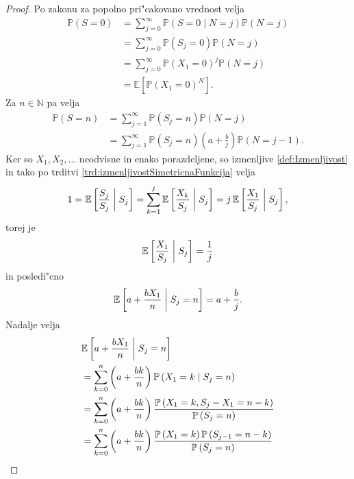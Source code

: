\documentclass[12pt, a4paper, reqno]{amsart}
\theoremstyle{definition}
\theoremstyle{plain}
\newcommand{\N}{\mathbb{N}}
\newcommand{\E}{\mathbb{E}}
\newcommand{\Prob}{\mathbb{P}}
\newcommand{\1}{\mathds{1}}
\newcommand*{\refPriloga}[1]{%
  \begingroup
    \hypersetup{
      linkcolor=red,
      linkbordercolor=red,
    }%
    \ref{#1}%
  \endgroup
}
\begin{document}
    \begin{proof}
        Po zakonu za popolno pri"cakovano vrednost velja
        \begin{align*}
            \Prob\left(S = 0\right) 
                &= \sum_{j = 0}^\infty\Prob\left(S = 0\mid N = j\right)\Prob\left(N = j\right) \\
                &= \sum_{j = 0}^\infty\Prob\left(S_j = 0\right)\Prob\left(N = j\right) \\
                &= \sum_{j = 0}^\infty\Prob\left(X_1 = 0\right)^j\Prob\left(N = j\right) \\
                &= \E\left[\Prob\left(X_1 = 0\right)^N\right].
        \end{align*}
        Za $n\in\N$ pa velja
        \begin{align}
            \Prob\left(S = n\right) 
                &= \sum_{j = 1}^\infty\Prob\left(S_j = n\right)\Prob\left(N = j\right) \nonumber \\
                &= \sum_{j = 1}^\infty\Prob\left(S_j = n\right)\left(a + \frac{b}{j}\right)\Prob\left(N = j - 1\right). \label{eq:PanjerRecursionSchemeProof}
        \end{align}
        Ker so $X_1, X_2, \dots$ neodvisne in enako porazdeljene, so izmenljive \refPriloga{def:Izmenljivost} in tako po 
        trditvi \refPriloga{trd:izmenljivostSimetricnaFunkcija} velja
        \begin{equation*}
            1 = \E\left[\frac{S_j}{S_j} \biggm|  S_j\right] = \sum_{k = 1}^j\E\left[\frac{X_k}{S_j} \biggm|  S_j\right] = j\,\E\left[\frac{X_1}{S_j} \biggm|  S_j\right],
        \end{equation*}
        torej je 
        \begin{equation*}
            \E\left[\frac{X_1}{S_j}  \biggm|  S_j\right] = \frac{1}{j}
        \end{equation*}
        in posledi"cno 
        \begin{equation}
            \E\left[a + \frac{bX_1}{n} \biggm|   S_j = n\right] = a + \frac{b}{j}.
            \label{eq:PanjerRecursionSchemeProof2}
        \end{equation}         
        Nadalje velja  
        \begin{align}   
            & \E\left[a + \frac{bX_1}{n} \biggm|   S_j = n\right] \nonumber \\
            &= \sum_{k = 0}^n\left(a + \frac{bk}{n}\right)\Prob\left(X_1 = k\mid S_j = n\right) \nonumber \\
            &= \sum_{k = 0}^n\left(a + \frac{bk}{n}\right)\frac{\Prob\left(X_1 = k, S_j - X_1 = n - k\right)}{\Prob\left(S_j = n\right)} \nonumber \\
            &= \sum_{k = 0}^n\left(a + \frac{bk}{n}\right)\frac{\Prob\left(X_1 = k\right)\Prob\left(S_{j- 1} = n - k\right)}{\Prob\left(S_j = n\right)} \label{eq:PanjerRecursionSchemeProof3} 
        \end{align}


\end{proof}
\end{document}
